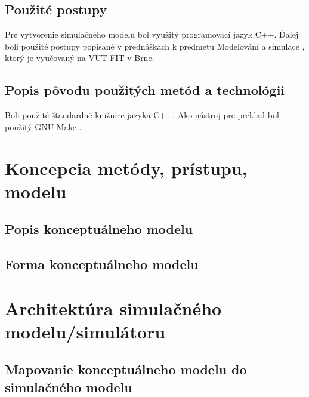\documentclass[a4paper, 11pt]{article}
\begin{document}
\subsection{Použité postupy}

Pre vytvorenie simulačného modelu bol využitý programovací jazyk C++. Ďalej boli použité postupy popísané v prednáškach k predmetu Modelování a simulace \cite{IMS_slides}, ktorý je vyučovaný na VUT FIT v Brne.

\subsection{Popis pôvodu použitých metód a technológii}

Boli použité štandardné knižnice jazyka C++. Ako nástroj pre preklad bol použitý GNU Make \cite{make}.

\pagebreak
\section{Koncepcia metódy, prístupu, modelu}



\subsection{Popis konceptuálneho modelu}



\subsection{Forma konceptuálneho modelu}



\pagebreak
\section{Architektúra simulačného modelu/simulátoru}



\subsection{Mapovanie konceptuálneho modelu do simulačného modelu}
\end{document}
